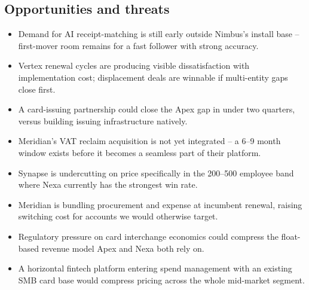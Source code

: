 \subsection{Opportunities and threats}

\begin{minipage}[t]{0.485\linewidth}
\begin{tcolorbox}[swotO, title={\faArrowUp\ Opportunities}]
\begin{itemize}[leftmargin=1.2em, itemsep=2pt]
  \item Demand for AI receipt-matching is still early outside Nimbus's install base --
    first-mover room remains for a fast follower with strong accuracy.
  \item Vertex renewal cycles are producing visible dissatisfaction with implementation cost;
    displacement deals are winnable if multi-entity gaps close first.
  \item A card-issuing partnership could close the Apex gap in under two quarters, versus
    building issuing infrastructure natively.
  \item Meridian's VAT reclaim acquisition is not yet integrated -- a 6--9 month window exists
    before it becomes a seamless part of their platform.
\end{itemize}
\end{tcolorbox}
\end{minipage}\hfill
\begin{minipage}[t]{0.485\linewidth}
\begin{tcolorbox}[swotT, title={\faExclamationTriangle\ Threats}]
\begin{itemize}[leftmargin=1.2em, itemsep=2pt]
  \item Synapse is undercutting on price specifically in the 200--500 employee band where Nexa
    currently has the strongest win rate.
  \item Meridian is bundling procurement and expense at incumbent renewal, raising switching
    cost for accounts we would otherwise target.
  \item Regulatory pressure on card interchange economics could compress the float-based
    revenue model Apex and Nexa both rely on.
  \item A horizontal fintech platform entering spend management with an existing SMB card base
    would compress pricing across the whole mid-market segment.
\end{itemize}
\end{tcolorbox}
\end{minipage}
